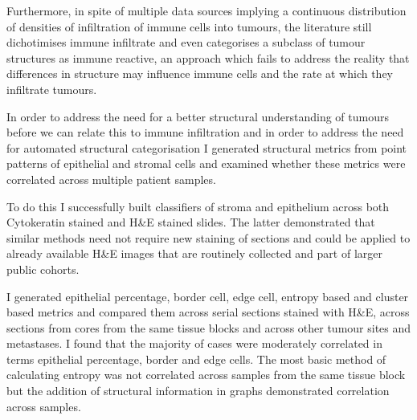 Furthermore, in spite of multiple data sources implying a continuous distribution of densities of infiltration of immune cells into tumours, the literature still dichotimises immune infiltrate and even categorises a subclass of tumour structures as immune reactive, an approach which fails to address the reality that differences in structure may influence immune cells and the rate at which they infiltrate tumours.


In order to address the need for a better structural understanding of tumours before we can relate this to immune infiltration and in order to address the need for automated structural categorisation I generated structural metrics from point patterns of epithelial and stromal cells and examined whether these metrics were correlated across multiple patient samples.

To do this I successfully built classifiers of stroma and epithelium across both Cytokeratin stained and H\&E stained slides. The latter demonstrated that similar methods need not require new staining of sections and could be applied to already available H\&E images that are routinely collected and part of larger public cohorts.

I generated epithelial percentage, border cell, edge cell, entropy based and cluster based metrics and compared them across serial sections stained with H\&E, across sections from cores from the same tissue blocks and across other tumour sites and metastases. I found that the majority of cases were moderately correlated in terms epithelial percentage,  border and edge cells. The most basic method of calculating entropy was not correlated across samples from the same tissue block but the addition of structural information in graphs demonstrated correlation across samples. 




